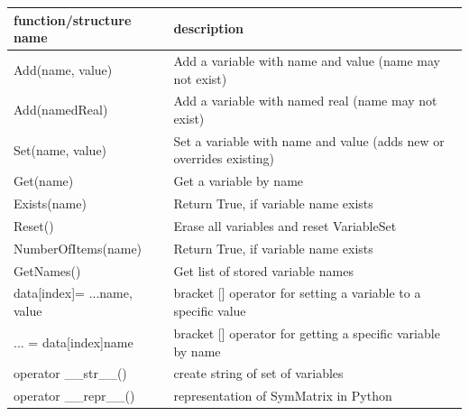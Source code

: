 \begin{center}
\footnotesize
\begin{longtable}{| p{8cm} | p{8cm} |} 
\hline
{\bf function/structure name} & {\bf description}\\ \hline
  Add(name, value) & Add a variable with name and value (name may not exist)\\ \hline 
  Add(namedReal) & Add a variable with named real (name may not exist)\\ \hline 
  Set(name, value) & Set a variable with name and value (adds new or overrides existing)\\ \hline 
  Get(name) & Get a variable by name\\ \hline 
  Exists(name) & Return True, if variable name exists\\ \hline 
  Reset() & Erase all variables and reset VariableSet\\ \hline 
  NumberOfItems(name) & Return True, if variable name exists\\ \hline 
  GetNames() & Get list of stored variable names\\ \hline 
  data[index]= ...name, value & bracket [] operator for setting a variable to a specific value\\ \hline 
  ... = data[index]name & bracket [] operator for getting a specific variable by name\\ \hline 
  operator \_\_str\_\_() & create string of set of variables\\ \hline  
  operator \_\_repr\_\_() & representation of SymMatrix in Python\\ \hline  
\end{longtable}
\end{center}




